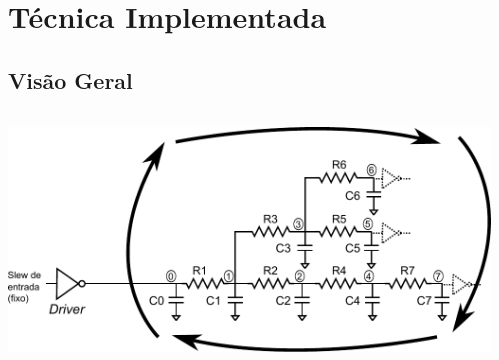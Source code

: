 \documentclass[10pt,a4paper]{beamer}
\begin{document}
	\section{Técnica Implementada}
	
		\subsection*{Visão Geral}
		
		\begin{frame}[t]
			\begin{center}
				\begin{columns}
					\begin{column}{0.63\textwidth}
						\includegraphics[width=\textwidth]{img/imagem_puri2.pdf} 
					\end{column}
					\begin{column}{0.37\textwidth}

\end{column}
\end{columns}
\end{center}
\end{frame}
\end{document}
